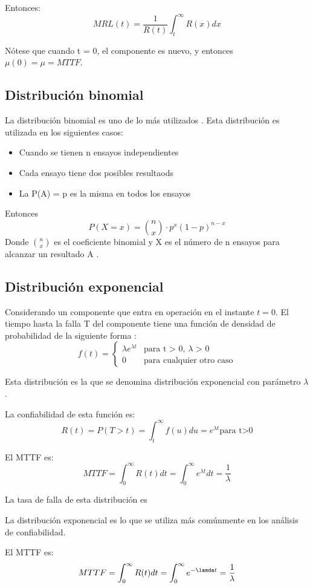 Entonces: $$MRL(t) = \frac{1}{R(t)}\int_t^\infty R(x)dx$$

Nótese que cuando t = 0, el componente es nuevo, y entonces $\mu(0) = \mu = MTTF$.

\subsection{Distribución binomial}
La distribución binomial es uno de lo más utilizados \citep{Rausand04}. Esta distribución es utilizada en los siguientes casos:
\begin{itemize}
  \item Cuando se tienen n ensayos independientes
  \item Cada ensayo tiene dos posibles resultaods
  \item La P(A) = p es la misma en todos los ensayos
\end{itemize}

Entonces $$P(X=x) = {{n}\choose{x}} \cdot p^x (1-p)^{n-x}$$ Donde ${n}\choose{x}$ es el coeficiente binomial y X es el número de n ensayos para alcanzar un resultado A \citep{Rausand04}.

\subsection{Distribución exponencial}
Considerando un componente que entra en operación en el instante $t=0$. El tiempo hasta la falla T del componente tiene una función de densidad de probabilidad de la siguiente forma \cite{Rausand04}:
$$ f(t) =\left \{
\begin{matrix}
  \lambda e^{\lambda t } & \text{para t > 0, } \lambda \text{ > 0}\\
  0                      & \text{para cualquier otro caso}
\end{matrix}
$$

Esta distribución es la que se denomina distribución exponencial con parámetro $\lambda$.

La confiabilidad de esta función  es: $$R(t) = P (T>t) = \int_t^\infty f(u) du  = e^{\lambda t} \text{para t>0} $$

El \ac{MTTF} es: $$MTTF = \int_0^\infty R(t) dt = \int_0^\infty e^{\lambda t} dt  = \frac{1}{\lambda}$$

La tasa de falla de esta distribución es \lambda

La distribución exponencial es lo que se utiliza más comúnmente en los análisis de confiabilidad.

El \ac{MTTF} es: $$MTTF = \int_0^\infty R(t)dt = \int_0^\infty e^{-\lamda t} = \frac{1}{\lambda}$$

